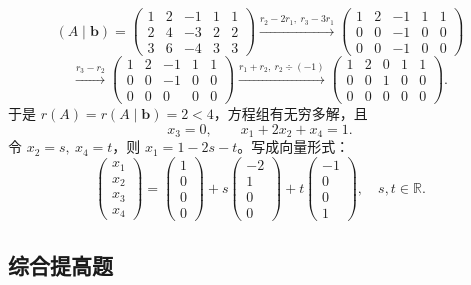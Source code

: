 \[
(A\mid\boldsymbol{b})=
\begin{pmatrix}
1&2&-1&1&1\\
2&4&-3&2&2\\
3&6&-4&3&3
\end{pmatrix}
\xrightarrow{r_2-2r_1,\ r_3-3r_1}
\begin{pmatrix}
1&2&-1&1&1\\
0&0&-1&0&0\\
0&0&-1&0&0
\end{pmatrix}
\]
\[
\xrightarrow{r_3-r_2}
\begin{pmatrix}
1&2&-1&1&1\\
0&0&-1&0&0\\
0&0&0&0&0
\end{pmatrix}
\xrightarrow{r_1+r_2,\ r_2\div(-1)}
\begin{pmatrix}
1&2&0&1&1\\
0&0&1&0&0\\
0&0&0&0&0
\end{pmatrix}.
\]
于是 \(r(A)=r(A\mid\boldsymbol{b})=2<4\)，方程组有无穷多解，且
\[
x_3=0,\qquad x_1+2x_2+x_4=1.
\]
令 \(x_2=s,\ x_4=t\)，则 \(x_1=1-2s-t\)。写成向量形式：
\[
\begin{pmatrix}x_1\\x_2\\x_3\\x_4\end{pmatrix}
=
\begin{pmatrix}1\\0\\0\\0\end{pmatrix}
+s\begin{pmatrix}-2\\1\\0\\0\end{pmatrix}
+t\begin{pmatrix}-1\\0\\0\\1\end{pmatrix},
\quad s,t\in\mathbb R.
\]
\else \answerarea[8] \fi%

\subsection{综合提高题}

